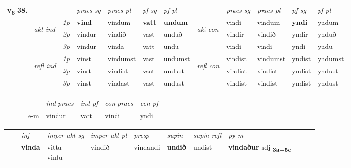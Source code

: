 \begin{tabular}{llllllllllll} \toprule
\multirow{4}{*}{{{\textbf{v{\textsubscript{6}}} \Large{\textbf{38.}}}}}  & &   &  \textit{praes sg}  & \textit{praes pl}  &\textit{ pf sg} & \textit{pf pl} &  &  \textit{praes sg}  & \textit{praes pl}  & \textit{pf sg} & \textit{pf pl } \\*
	\cmidrule{4-7} \cmidrule{9-12}
 & \multirow{3}{*}{\begin{turn}{90}\textit{akt ind}\end{turn}} & {\textit{1p}} & \textbf{vind} & vindum    & \textbf{vatt} & \textbf{undum} & \multirow{3}{*}{\begin{turn}{90}\textit{akt con}\end{turn}} &vindi & vindum & \textbf{yndi} & yndum\\*
& &  {\textit{2p}} &  vindur  & vindið   & vast & unduð & & vindir & vindið & yndir & ynduð \\*
& &  {\textit{3p}} & vindur & vinda   & vatt & undu & & vindi & vindi& yndi & yndu  \\*
\cmidrule{4-7} \cmidrule{9-12}
 &\multirow{3}{*}{\begin{turn}{90}\textit{refl ind}\end{turn}} & {\textit{1p}} & vinst & vindumst    & vast & undumst & \multirow{3}{*}{\begin{turn}{90}\textit{refl con}\end{turn}}  &vindist & vindumst & yndist & yndumst\\*
 &&  {\textit{2p}} &  vinst  & vindist   & vast & undust & &vindist & vindist & yndist & yndust \\*
& &  {\textit{3p}} & vinst & vindast   & vast & undust & & vindist & vindist& yndist & yndust  \\*
\cmidrule{4-7} \cmidrule{9-12}
\end{tabular}


\begin{tabular}{llllllllllll}
 & &  & &  \textit{ind praes} & \textit{ind pf} & \textit{con praes} & \textit{con pf} \\*
&  & & e-m & vindur & vatt & vindi & yndi \\*
\cmidrule{5-9}
\end{tabular}


\begin{tabular}{llllllllllll}
 & & \textit{inf} & \textit{imper akt sg} & \textit{imper akt pl}   & \textit{presp} & \textit{supin} & \textit{supin refl} & \textit{pp m}     \\*
  & & \textbf{vinda} & \specialcell{vittu\\ vintu}  & vindið   & vindandi &  \textbf{undið} & undist & \textbf{vindaður} adj \textbf{\textsubscript{3a+5c}} \\*
\cmidrule{1-12}
\end{tabular}



